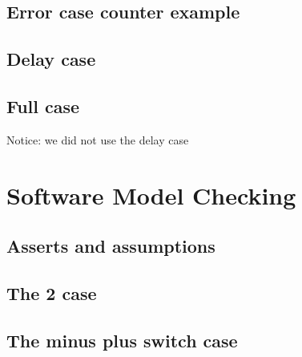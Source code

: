 \documentclass[a4paper]{article}
\begin{document}
	\subsection{Error case counter example}
	
	
	\subsection{Delay case}
	
	
	\subsection{Full case}
	Notice: we did not use the delay case
	
	
	\section{Software Model Checking}
	
	
	\subsection{Asserts and assumptions}
	
	
	\subsection{The 2 case}
	
	
	\subsection{The minus plus switch case}
	
	
	
\end{document}
